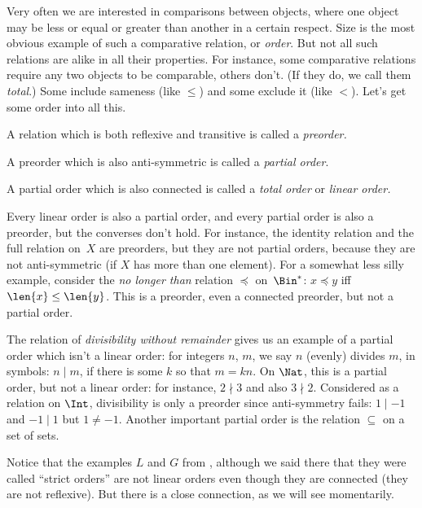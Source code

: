 \documentclass[../../../include/open-logic-section]{subfiles}
\begin{document}

\begin{explain}
Very often we are interested in comparisons between objects, where one
object may be less or equal or greater than another in a certain
respect.  Size is the most obvious example of such a comparative
relation, or \emph{order}. But not all such relations are alike in all
their properties. For instance, some comparative relations require any
two objects to be comparable, others don't. (If they do, we call them
\emph{total}.) Some include sameness (like $\le$) and some exclude it
(like $<$). Let's get some order into all this.
\end{explain}

\begin{defn}[Preorder]
A relation which is both reflexive and transitive is called a
\emph{preorder.}  
\end{defn}

\begin{defn}
A preorder which is also anti-symmetric is called a
\emph{partial order}.
\end{defn}

\begin{defn}
A partial order which is also connected is called a
\emph{total order} or \emph{linear order.}
\end{defn}

\begin{ex}
Every linear order is also a partial order, and every partial order is
also a preorder, but the converses don't hold. For instance, the
identity relation and the full relation on~$X$ are preorders, but they
are not partial orders, because they are not anti-symmetric (if $X$
has more than one element). For a somewhat less silly example,
consider the \emph{no longer than} relation $\preccurlyeq$
on~$\Bin^*$: $x \preccurlyeq y$ iff $\len{x} \le \len{y}$. This is a
preorder, even a connected preorder, but not a partial order.

The relation of \emph{divisibility without remainder} gives us an
example of a partial order which isn't a linear order: for integers
$n$, $m$, we say $n$ (evenly) divides $m$, in symbols: $n\mid m$, if
there is some $k$ so that $m=kn$. On $\Nat$, this is a partial order,
but not a linear order: for instance, $2\nmid3$ and also
$3\nmid2$. Considered as a relation on $\Int$, divisibility is only a
preorder since anti-symmetry fails: $1\mid-1$ and $-1\mid1$ but
$1\neq-1$. Another important partial order is the relation $\subseteq$
on a set of sets.

Notice that the examples $L$ and $G$ from ,
although we said there that they were called ``strict orders'' are not
linear orders even though they are connected (they are not
reflexive). But there is a close connection, as we will see
momentarily.
\end{ex}
\end{document}

